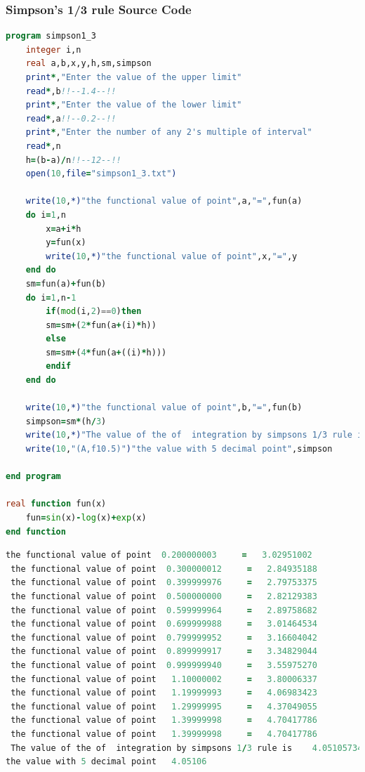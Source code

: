 \documentclass{article}
\begin{document}
\subsubsection{Simpson's 1/3 rule Source Code}
\begin{lstlisting}[language=Fortran,caption=Simpson's 1/3 rule]
program simpson1_3
    integer i,n
    real a,b,x,y,h,sm,simpson
    print*,"Enter the value of the upper limit"
    read*,b!!--1.4--!!
    print*,"Enter the value of the lower limit"
    read*,a!!--0.2--!!
    print*,"Enter the number of any 2's multiple of interval"
    read*,n
    h=(b-a)/n!!--12--!!
    open(10,file="simpson1_3.txt")

    write(10,*)"the functional value of point",a,"=",fun(a)
    do i=1,n
        x=a+i*h
        y=fun(x)
        write(10,*)"the functional value of point",x,"=",y
    end do
    sm=fun(a)+fun(b)
    do i=1,n-1
        if(mod(i,2)==0)then
        sm=sm+(2*fun(a+(i)*h))
        else
        sm=sm+(4*fun(a+((i)*h)))
        endif
    end do

    write(10,*)"the functional value of point",b,"=",fun(b)
    simpson=sm*(h/3)
    write(10,*)"The value of the of  integration by simpsons 1/3 rule is ",simpson
    write(10,"(A,f10.5)")"the value with 5 decimal point",simpson

end program

real function fun(x)
    fun=sin(x)-log(x)+exp(x)
end function
\end{lstlisting}
\begin{lstlisting}[language=Fortran,caption= Simpson's 1/3 rule Output]
 the functional value of point  0.200000003     =   3.02951002    
 the functional value of point  0.300000012     =   2.84935188    
 the functional value of point  0.399999976     =   2.79753375    
 the functional value of point  0.500000000     =   2.82129383    
 the functional value of point  0.599999964     =   2.89758682    
 the functional value of point  0.699999988     =   3.01464534    
 the functional value of point  0.799999952     =   3.16604042    
 the functional value of point  0.899999917     =   3.34829044    
 the functional value of point  0.999999940     =   3.55975270    
 the functional value of point   1.10000002     =   3.80006337    
 the functional value of point   1.19999993     =   4.06983423    
 the functional value of point   1.29999995     =   4.37049055    
 the functional value of point   1.39999998     =   4.70417786    
 the functional value of point   1.39999998     =   4.70417786    
 The value of the of  integration by simpsons 1/3 rule is    4.05105734    
the value with 5 decimal point   4.05106


 
\end{lstlisting}
\end{document}
